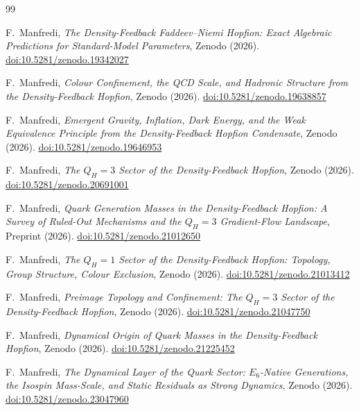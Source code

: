 \documentclass[11pt,a4paper]{article}
\theoremstyle{definition}\newtheorem{definition}[theorem]{Definition}
\theoremstyle{remark}
\begin{document}
\begin{thebibliography}{99}

F.~Manfredi,
\textit{The Density-Feedback Faddeev--Niemi Hopfion:
  Exact Algebraic Predictions for Standard-Model Parameters},
Zenodo (2026).
\href{https://doi.org/10.5281/zenodo.19342027}{doi:10.5281/zenodo.19342027}

F.~Manfredi,
\textit{Colour Confinement, the QCD Scale, and Hadronic Structure
  from the Density-Feedback Hopfion},
Zenodo (2026).
\href{https://doi.org/10.5281/zenodo.19638857}{doi:10.5281/zenodo.19638857}

F.~Manfredi,
\textit{Emergent Gravity, Inflation, Dark Energy, and the Weak
  Equivalence Principle from the Density-Feedback Hopfion Condensate},
Zenodo (2026).
\href{https://doi.org/10.5281/zenodo.19646953}{doi:10.5281/zenodo.19646953}

F.~Manfredi,
\textit{The $Q_H=3$ Sector of the Density-Feedback Hopfion},
Zenodo (2026).
\href{https://doi.org/10.5281/zenodo.20691001}{doi:10.5281/zenodo.20691001}

F.~Manfredi,
\textit{Quark Generation Masses in the Density-Feedback Hopfion:
A Survey of Ruled-Out Mechanisms and the $Q_H=3$ Gradient-Flow Landscape},
Preprint (2026).
\href{https://doi.org/10.5281/zenodo.21012650}{doi:10.5281/zenodo.21012650}

F.~Manfredi,
\textit{The $Q_H=1$ Sector of the Density-Feedback Hopfion:
Topology, Group Structure, Colour Exclusion},
Zenodo (2026).
\href{https://doi.org/10.5281/zenodo.21013412}{doi:10.5281/zenodo.21013412}

F.~Manfredi,
\textit{Preimage Topology and Confinement: The $Q_H=3$ Sector of the
Density-Feedback Hopfion},
Zenodo (2026).
\href{https://doi.org/10.5281/zenodo.21047750}{doi:10.5281/zenodo.21047750}

F.~Manfredi,
\textit{Dynamical Origin of Quark Masses in the Density-Feedback Hopfion},
Zenodo (2026).
\href{https://doi.org/10.5281/zenodo.21225452}{doi:10.5281/zenodo.21225452}

F.~Manfredi,
\textit{The Dynamical Layer of the Quark Sector: $E_6$-Native
Generations, the Isospin Mass-Scale, and Static Residuals as Strong
Dynamics},
Zenodo (2026).
\href{https://doi.org/10.5281/zenodo.23047960}{doi:10.5281/zenodo.23047960}


\end{thebibliography}
\end{document}
